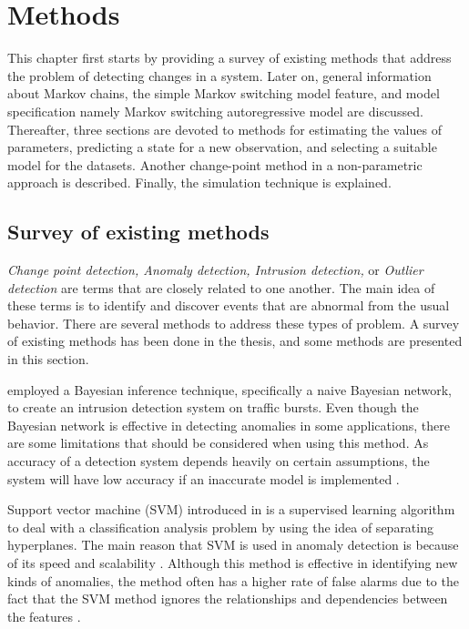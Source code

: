 
\lhead[\chaptername~\thechapter]{\rightmark}

\rhead[\leftmark]{}

\lfoot[\thepage]{}

\cfoot{}

\rfoot[]{\thepage}

\chapter{Methods}

This chapter first starts by providing a survey of existing methods
that address the problem of detecting changes in a system. Later on,
general information about Markov chains, the simple Markov switching
model feature, and model specification namely Markov switching autoregressive
model are discussed. Thereafter, three sections are devoted to methods
for estimating the values of parameters, predicting a state for a
new observation, and selecting a suitable model for the datasets.
Another change-point method in a non-parametric approach is described.
Finally, the simulation technique is explained.

\section{Survey of existing methods}

\emph{Change point detection, Anomaly detection, Intrusion detection,
}or \emph{Outlier detection} are terms that are closely related to
one another. The main idea of these terms is to identify and discover
events that are abnormal from the usual behavior. There are several
methods to address these types of problem. A survey of existing methods
has been done in the thesis, and some methods are presented in this
section.

\citet{valdes2000adaptive} employed a Bayesian inference technique,
specifically a naive Bayesian network, to create an intrusion detection
system on traffic bursts. Even though the Bayesian network is effective
in detecting anomalies in some applications, there are some limitations
that should be considered when using this method. As accuracy of a
detection system depends heavily on certain assumptions, the system
will have low accuracy if an inaccurate model is implemented \citep{patcha2007overview}.

Support vector machine (SVM) introduced in \citet{cortes1995support}
is a supervised learning algorithm to deal with a classification analysis
problem by using the idea of separating hyperplanes. The main reason
that SVM is used in anomaly detection is because of its speed and
scalability \citep{sung2003identifying}. Although this method is
effective in identifying new kinds of anomalies, the method often
has a higher rate of false alarms due to the fact that the SVM method
ignores the relationships and dependencies between the features \citep{sarasamma2005hierarchical}. 

